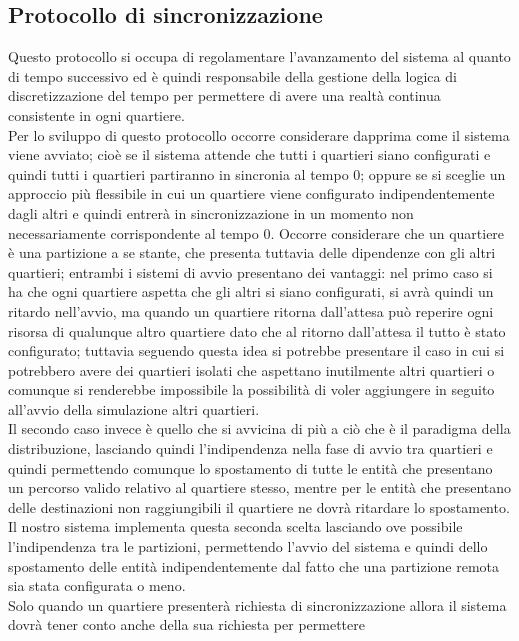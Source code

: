 \subsection{Protocollo di sincronizzazione}
\label{protosynch}
Questo protocollo si occupa di regolamentare l'avanzamento del sistema al
quanto di tempo successivo ed è quindi responsabile della
gestione della logica di discretizzazione del tempo per permettere di avere una
realtà continua consistente in ogni quartiere.\\
Per lo sviluppo di questo protocollo occorre considerare dapprima come il
sistema viene avviato; cioè se il sistema attende che tutti i quartieri siano
configurati e quindi tutti i quartieri partiranno in sincronia al tempo 0;
oppure se si sceglie un approccio più flessibile in cui un quartiere viene
configurato indipendentemente dagli altri e quindi entrerà in sincronizzazione
in un momento non necessariamente corrispondente al tempo 0. Occorre
considerare che un quartiere è una partizione a se stante, che presenta
tuttavia delle dipendenze con gli altri quartieri; entrambi i sistemi di avvio
presentano dei vantaggi: nel primo caso si ha che ogni quartiere aspetta che
gli altri si siano configurati, si avrà quindi un ritardo nell'avvio, ma quando
un quartiere ritorna dall'attesa può reperire ogni risorsa di qualunque altro
quartiere dato che al ritorno dall'attesa il tutto è stato configurato;
tuttavia seguendo questa idea si potrebbe presentare il caso in cui si
potrebbero avere dei quartieri isolati che aspettano inutilmente altri
quartieri o comunque si renderebbe impossibile la possibilità di voler
aggiungere in seguito all'avvio della simulazione altri quartieri.\\
Il secondo caso invece è quello che si avvicina di più a ciò che è il paradigma
della distribuzione, lasciando quindi l'indipendenza nella fase di avvio tra
quartieri e quindi permettendo comunque lo spostamento di tutte le entità che
presentano un percorso valido relativo al quartiere stesso, mentre per le
entità che presentano delle destinazioni non raggiungibili il quartiere ne
dovrà ritardare lo spostamento. Il nostro sistema implementa questa seconda
scelta lasciando ove possibile l'indipendenza tra le partizioni, permettendo
l'avvio del sistema e quindi dello spostamento delle entità indipendentemente
dal fatto che una partizione remota sia stata configurata o meno.\\
Solo quando un quartiere presenterà richiesta di sincronizzazione allora il
sistema dovrà tener conto anche della sua richiesta per permettere
